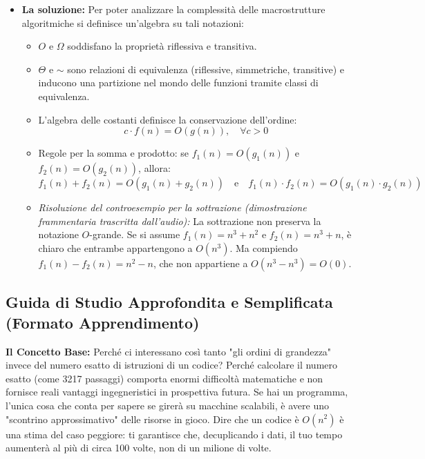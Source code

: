 \documentclass[a4paper, 11pt]{report}
\begin{document}
\begin{itemize}
\item \textbf{La soluzione:} Per poter analizzare la complessità delle macrostrutture algoritmiche si definisce un'algebra su tali notazioni:
\begin{itemize}
    \item $O$ e $\Omega$ soddisfano la proprietà riflessiva e transitiva.
    \item $\Theta$ e $\sim$ sono relazioni di equivalenza (riflessive, simmetriche, transitive) e inducono una partizione nel mondo delle funzioni tramite classi di equivalenza.
    \item L'algebra delle costanti definisce la conservazione dell'ordine:
    \[ c \cdot f(n) = O(g(n)), \quad \forall c > 0 \]
    \item Regole per la somma e prodotto: se $f_1(n) = O(g_1(n))$ e $f_2(n) = O(g_2(n))$, allora:
    \begin{equation*}
    f_1(n) + f_2(n) = O(g_1(n) + g_2(n)) \quad \text{e} \quad f_1(n) \cdot f_2(n) = O(g_1(n) \cdot g_2(n))
    \end{equation*}
    \item \textit{Risoluzione del controesempio per la sottrazione (dimostrazione frammentaria trascritta dall'audio):} La sottrazione non preserva la notazione $O$-grande. Se si assume $f_1(n) = n^3 + n^2$ e $f_2(n) = n^3 + n$, è chiaro che entrambe appartengono a $O(n^3)$. Ma compiendo $f_1(n) - f_2(n) = n^2 - n$, che non appartiene a $O(n^3 - n^3) = O(0)$.
\end{itemize}
\end{itemize}

\vspace{0.5cm}
\subsection*{Guida di Studio Approfondita e Semplificata (Formato Apprendimento)}


\textbf{Il Concetto Base:}
Perché ci interessano così tanto "gli ordini di grandezza" invece del numero esatto di istruzioni di un codice? Perché calcolare il numero esatto (come 3217 passaggi) comporta enormi difficoltà matematiche e non fornisce reali vantaggi ingegneristici in prospettiva futura. Se hai un programma, l'unica cosa che conta per sapere se girerà su macchine scalabili, è avere uno "scontrino approssimativo" delle risorse in gioco. Dire che un codice è $O(n^2)$ è una stima del caso peggiore: ti garantisce che, decuplicando i dati, il tuo tempo aumenterà al più di circa 100 volte, non di un milione di volte.
\end{document}
